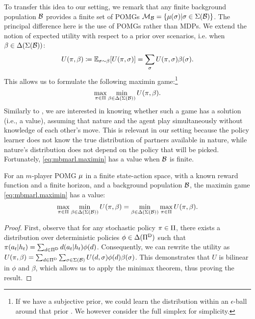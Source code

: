 To transfer this idea to our setting, we remark that any finite background population $\mathcal{B}$ provides a finite set of POMGs $\mathcal{M}_{\mathcal{B}} = \{\mu(\sigma) | \sigma \in \Sigma(\mathcal{B})\}$. The principal difference here is the use of POMGs rather than MDPs. We extend the notion of expected utility with respect to a prior over scenarios, i.e. when $\beta \in \Delta(\Sigma(\mathcal{B}))$:
\begin{equation}
    U(\pi, \beta) \coloneqq \mathbb{E}_{\sigma \sim \beta}[U(\pi, \sigma)] = \sum_{\sigma} U(\pi, \sigma) \beta(\sigma).
\end{equation}
This allows us to formulate the following maximin game:\footnote{
If we have a subjective prior, we could learn the distribution within an $\epsilon$-ball around that prior \citep{li_bayes_optimal_robust_2024}. We however consider the full simplex for simplicity.
}
\begin{equation}
    \label{eq:mbmarl.maximin}
    \max_{\pi \in \Pi} \min_{\beta \in \Delta(\Sigma(\mathcal{B}))} U(\pi, \beta).
\end{equation}
Similarly to \citet{buening_minimax_bayes_reinforcement_2023}, we are interested in knowing whether such a game has a solution (i.e., a value), assuming that nature and the agent play simultaneously without knowledge of each other's move. This is relevant in our setting because the policy learner does not know the true distribution of partners available in nature, while nature's distribution does not depend on the policy that will be picked. Fortunately, \eqref{eq:mbmarl.maximin} has a value when $\mathcal{B}$ is finite.
\begin{corollary}
For an $m$-player POMG $\mu$ in a finite state-action space, with a known reward function and a finite horizon, and a background population $\mathcal{B}$, the maximin game \eqref{eq:mbmarl.maximin} has a value:
\begin{equation}
    \label{eq:maximin_value}
    \max_{\pi \in \Pi} \min_{\beta \in \Delta(\Sigma(\mathcal{B}))} U(\pi, \beta) = \min_{\beta \in \Delta(\Sigma(\mathcal{B}))} \max_{\pi \in \Pi} U(\pi, \beta).
\end{equation}
\end{corollary}
\begin{proof}
First, observe that for any stochastic policy $\pi \in \Pi$, there exists a distribution over deterministic policies $\phi \in \Delta(\Pi^\text{D})$ such that $\pi(a_t|h_t) = \sum_{d \in \Pi^\text{D}} d(a_t|h_t) \phi(d)$. Consequently, we can rewrite the utility as $U(\pi, \beta) = \sum_{d \in \Pi^\text{D}} \sum_{\sigma \in \Sigma(\mathcal{B})} U(d, \sigma) \phi(d) \beta(\sigma)$. This demonstrates that $U$ is bilinear in $\phi$ and $\beta$, which allows us to apply the minimax theorem, thus proving the result.
\end{proof}

